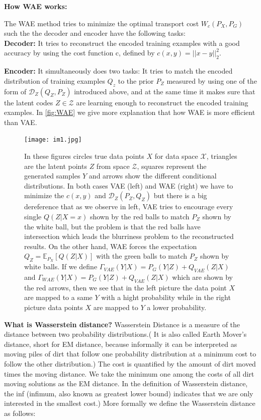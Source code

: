 \documentclass[12pt,english]{amsart}
\begin{document}
\textbf{How WAE works:}

The WAE method tries to minimize the optimal transport cost $W_c(P_X, P_G)$ such
the the decoder and encoder have the following tasks:\\

\textbf{Decoder:} It tries to reconstruct the encoded training examples with a
good accuracy by using the cost function c, defined by $c(x,y)= ||x-y||_2^2$.

\textbf{Encoder:} It simultaneously does two tasks: It tries to match the encoded
distribution of training examples $Q_z$ to the prior $P_Z$ measured by using one
of the form of $\mathcal{D}_Z(Q_Z,P_Z)$ introduced above, and at the same time it
makes sure that the latent codes $Z \in \mathcal{Z}$ are learning enough to
reconstruct the encoded training examples.  In \ref{fig:WAE} we give more explanation
that how WAE is more efficient than VAE.

\begin{figure}[h!]
\centering
\texttt{[image: im1.jpg]}

\caption{In these figures circles true data points $X$ for data space
$\mathcal{X}$, triangles are the latent points $Z$ from space $\mathcal{Z}$,
squares represent the generated samples $Y$ and arrows show the different
conditional distributions. In both cases VAE (left) and WAE (right) we have to
minimize the $c(x,y)$ and $\mathcal{D}_Z(P_Z,Q_Z)$  but there is a big
dereference that as we observe in left, VAE tries to encourage every single
$Q(Z|X=x)$ shown by the red balls to match $P_Z$ shown by the white ball, but
the problem is that the red balls have intersection which leads the blurriness
problem to the reconstructed results. On the other hand, WAE forces the
expectation $Q_Z= \mathbb{E}_{P_X}\left[ Q(Z|X)\right]$  with the green balls to
match $P_Z$ shown by white balls. If we define
$\Gamma_{VAE}(Y|X)= P_G(Y|Z)+ Q_{VAE}(Z|X)$ and
$\Gamma _{WAE}(Y|X)= P_G(Y|Z)+ Q_{VAE}(Z|X)$ which are shown by the red arrows,
then we see that in the left picture the data point $X$ are mapped to a same $Y$
with a hight probability while in the right picture data points $X$ are mapped to
$Y$ a lower probability. }

\label{Figure 1}
\end{figure}

\textbf{What is Wasserstein distance?}
Wasserstein Distance is a measure of the distance between two probability
distributions.( It is also called Earth Mover's distance, short for EM distance,
because informally it can be interpreted as moving piles of dirt that follow one
probability distribution at a minimum cost to follow the other distribution.)
The cost is quantified by the amount of dirt moved times the moving distance. We
take the minimum one among the costs of all dirt moving solutions as the EM
distance. In the definition of Wasserstein distance, the inf (infimum, also
known as greatest lower bound) indicates that we are only interested in the
smallest cost.) More formally we define the Wasserstein distance as follows:
\end{document}
